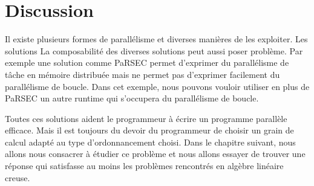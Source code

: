 \section{Discussion}
Il existe plusieurs formes de parallélisme et diverses manières de les exploiter.
%
Les solutions
%
La composabilité des diverses solutions peut aussi poser problème.
%
Par exemple une solution comme PaRSEC permet d'exprimer du parallélisme de tâche en mémoire distribuée mais ne permet pas d'exprimer facilement du parallélisme de boucle.
%
Dans cet exemple, nous pouvons vouloir utiliser en plus de PaRSEC un autre runtime qui s'occupera du parallélisme de boucle.
%


Toutes ces solutions aident le programmeur à écrire un programme parallèle efficace.
%
Mais il est toujours du devoir du programmeur de choisir un grain de calcul adapté au type d'ordonnancement choisi.
%
Dans le chapitre suivant, nous allons nous consacrer à étudier ce problème et nous allons essayer de trouver une réponse qui satisfasse au moins les problèmes rencontrés en algèbre linéaire creuse.
